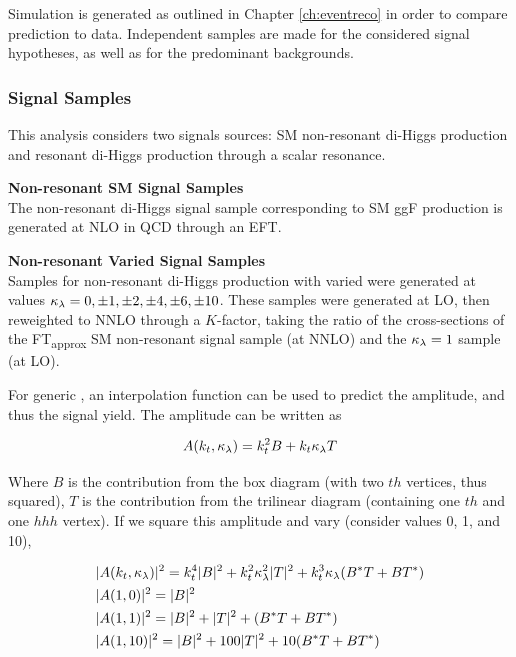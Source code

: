 Simulation is generated as outlined in Chapter \ref{ch:eventreco} in order to compare prediction to data. Independent samples are made for the considered signal hypotheses, as well as for the predominant backgrounds.

\subsubsection{Signal Samples}

This analysis considers two signals sources: \gls{SM} non-resonant di-Higgs production and resonant di-Higgs production through a scalar resonance.

\noindent\textbf{Non-resonant \gls{SM} Signal Samples}\\
\indent The non-resonant di-Higgs signal sample corresponding to \gls{SM} \gls{ggF} \hh production is generated at \gls{NLO} in \gls{QCD} through an \gls{EFT}.

\noindent\textbf{Non-resonant Varied \klambda Signal Samples}\\
\indent Samples for non-resonant di-Higgs production with varied \klambda were generated at values $\kappa_{\lambda} = 0, \pm 1, \pm 2, \pm 4, \pm 6, \pm 10$. These samples were generated at \gls{LO}, then reweighted to \gls{NNLO} through a $K$-factor, taking the ratio of the cross-sections of the FT\textsubscript{approx} \gls{SM} non-resonant signal sample (at \gls{NNLO}) and the $\kappa_{\lambda} =1$ sample (at \gls{LO}).

For generic \klambda, an interpolation function can be used to predict the amplitude, and thus the signal yield. The amplitude can be written as

\begin{equation}
  A(k_t,\kappa_{\lambda}) = k_t^2 B + k_t \kappa_{\lambda} T
\end{equation}

Where $B$ is the contribution from the box diagram (with two $th$ vertices, thus squared), $T$ is the contribution from the trilinear diagram (containing one $th$ and one $hhh$ vertex). If we square this amplitude and vary \klambda (consider values 0, 1, and 10),

\begin{align}
  &|A(k_t,\kappa_{\lambda})|^2 = k_t^4 |B|^2 + k_t^2\kappa_{\lambda}^2 |T|^2 + k_t^3\kappa_{\lambda}(B^*T + BT^*)\\
  &|A(1,0)|^2 = |B|^2\\
  &|A(1,1)|^2 = |B|^2 + |T|^2 + (B^*T + BT^*)\\
  &|A(1,10)|^2 = |B|^2 + 100|T|^2 + 10(B^*T + BT^*)
\end{align}

